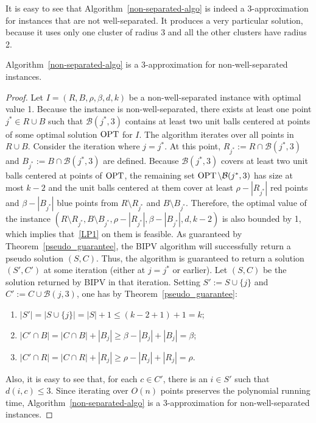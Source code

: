 It is easy to see that {Algorithm~\ref{non-separated-algo}} is indeed a 3-approximation for instances that are not well-separated. It produces a very particular solution, because it uses only one cluster of radius 3 and all the other clusters have radius 2.
\begin{theorem}
    \label{non-separated-theorem}
    {\rm {Algorithm~\ref{non-separated-algo}}} is a 3-approximation for non-well-separated instances.
\end{theorem}
\begin{proof}
Let $I = (R, B, \rho, \beta, d, k)$ be a non-well-separated instance with optimal value 1. Because the instance is non-well-separated, there exists at least one point $j^* \in R \cup B$ such that $\mathcal{B}(j^*, 3)$ contains at least two unit balls centered at points of some optimal solution $\operatorname{OPT}$ for $I$. 
The algorithm iterates over all points in $R \cup B$. Consider the iteration where $j = j^*$. At this point, $R_{j^*} := R \cap \mathcal{B}(j^*, 3)$ and $B_{j^*} := B \cap \mathcal{B}(j^*, 3)$ are defined. Because $\mathcal{B}(j^*, 3)$ covers at least two unit balls centered at points of $\operatorname{OPT}$, the remaining set $\operatorname{OPT} \setminus \mathcal{B}(j^*, 3)$ has size at most $k - 2$ and the unit balls centered at them cover at least $\rho - |R_{j^*}|$ red points and $\beta - |B_{j^*}|$ blue points from $R \setminus R_{j^*}$ and $B \setminus B_{j^*}$.
Therefore, the optimal value of the instance $(R \setminus R_{j^*}, B \setminus B_{j^*}, \rho - |R_{j^*}|, \beta - |B_{j^*}|, d, k - 2)$ is also bounded by 1, which implies that~\ref{LP1} on them is feasible. As guaranteed by Theorem~\ref{pseudo_guarantee}, the BIPV algorithm will successfully return a pseudo solution $(S, C)$.
Thus, the algorithm is guaranteed to return a solution $(S', C')$ at some iteration (either at $j = j^*$ or earlier). Let $(S, C)$ be the solution returned by BIPV in that iteration. Setting $S' := S \cup \{j\}$ and $C' := C \cup \mathcal{B}(j, 3)$, one has by Theorem~\ref{pseudo_guarantee}:
\begin{enumerate}
    \item $|S'| = |S \cup \{j\}| = |S| + 1 \le (k - 2 + 1) + 1 = k$;
    \item $|C' \cap B| = |C \cap B| + |B_j| \ge \beta - |B_j| + |B_j| = \beta$;
    \item $|C' \cap R| = |C \cap R| + |R_j| \ge \rho - |R_j| + |R_j| = \rho$.
\end{enumerate}
Also, it is easy to see that, for each $c \in C'$, there is an $i \in S'$ such that $d(i, c) \le 3$. Since iterating over $O(n)$ points preserves the polynomial running time, {Algorithm~\ref{non-separated-algo}} is a 3-approximation for non-well-separated instances.
\end{proof}

